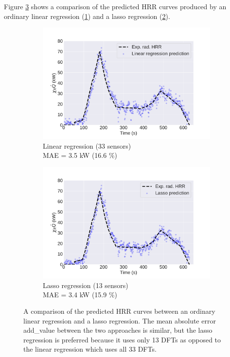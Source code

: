 \documentclass{article}
\begin{document}
Figure \ref{fig:dft_regressions} shows a comparison of the predicted HRR curves produced by an ordinary linear regression (\ref{fig:linreg_rad}) and a lasso regression (\ref{fig:lasso_rad}).

\begin{figure}[htbp]
  \centering
  \begin{subfigure}[t]{.45\textwidth}
      \centering
      \includegraphics[width=\textwidth,keepaspectratio]{figures/linreg_rad.pdf}
      \caption{Linear regression (33 sensors) \\ MAE = 3.5 kW (16.6 \%)}
      \label{fig:linreg_rad}
  \end{subfigure}
  \begin{subfigure}[t]{.45\textwidth}
      \centering
      \includegraphics[width=\textwidth ,keepaspectratio]{figures/lasso_rad.pdf}
      \caption{Lasso regression (13 sensors) \\ MAE = 3.4 kW (15.9 \%)}
      \label{fig:lasso_rad}
  \end{subfigure}
  \caption{A comparison of the predicted HRR curves between an ordinary linear regression and a lasso regression. The mean absolute error add_value between the two approaches is similar, but the lasso regression is preferred because it uses only 13 DFTs as opposed to the linear regression which uses all 33 DFTs. } 
  \label{fig:dft_regressions}
\end{figure}
\end{document}

